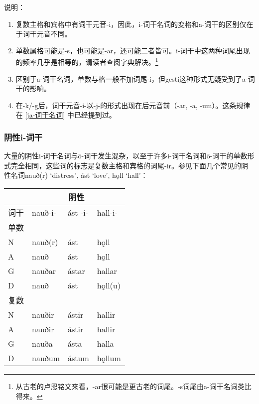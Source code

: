 说明：

\begin{enumerate}
  \item
        复数主格和宾格中有词干元音-i，因此，i-词干名词的变格和a-词干的区别仅在于词干元音不同。
  \item
        单数属格可能是-s，也可能是-ar，还可能二者皆可。i-词干中这两种词尾出现的频率几乎是相等的，请读者查阅字典解决。\footnote{从古老的卢恩铭文来看，-ar很可能是更古老的词尾。-s词尾由a-词干名词类比得来。}
  \item
        区别于a-词干名词，单数与格一般不加词尾-i，但gesti这种形式无疑受到了a-词干的影响。
  \item
        在-k/-g后，词干元音-i-以-j-的形式出现在后元音前（-ar, -a,
        -um）。这条规律在 \ref{ja-词干名词} 中已经提到过。
\end{enumerate}

\subsubsection{阴性i-词干}\label{阴性i-词干}

大量的阴性i-词干名词与ō-词干发生混杂，以至于许多i-词干名词和ō-词干的单数形式完全相同，这些词的标志是复数主格和宾格的词尾-ir。参见下面几个常见的阴性名词nauð(r)
`distress', ást `love', hǫll `hall'：

\begin{longtable}{llll}
  \toprule
     & \multicolumn{3}{c}{\textbf{阴性}}                     \\
  \midrule
  \endhead
  \bottomrule
  \endfoot
  词干 & nauð-i-                         & ást -i- & hall-i- \\
  单数 &                                 &         &         \\
  N  & nauð(r)                         & ást     & hǫll    \\
  A  & nauð                            & ást     & hǫll    \\
  G  & nauðar                          & ástar   & hallar  \\
  D  & nauð                            & ást     & hǫll(u) \\
  复数 &                                 &         &         \\
  N  & nauðir                          & ástir   & hallir  \\
  A  & nauðir                          & ástir   & hallir  \\
  G  & nauða                           & ásta    & halla   \\
  D  & nauðum                          & ástum   & hǫllum  \\
\end{longtable}


